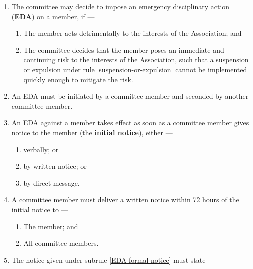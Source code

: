 \documentclass[../constitution.tex]{subfiles}
\begin{document}
\begin{enumerate}

  \item The committee may decide to impose an emergency disciplinary action (\textbf{EDA}) on a member, if ---

        \begin{enumerate}
          \item The member acts detrimentally to the interests of the Association; and
          \item The committee decides that the member poses an immediate and continuing risk to the interests of the Association, such that a suspension or expulsion under rule \ref{suspension-or-expulsion} cannot be implemented quickly enough to mitigate the risk.
        \end{enumerate}

  \item An EDA must be initiated by a committee member and seconded by another committee member.

  \item \label{EDA-initial-notice} An EDA against a member takes effect as soon as a committee member gives notice to the member (the \textbf{initial notice}), either ---

        \begin{enumerate}
          \item verbally; or
          \item by written notice; or
          \item by direct message.
        \end{enumerate}

  \item \label{EDA-formal-notice} A committee member must deliver a written notice within 72 hours of the initial notice to ---

        \begin{enumerate}
          \item The member; and
          \item All committee members.
        \end{enumerate}

  \item The notice given under subrule \ref{EDA-formal-notice} must state ---


\end{enumerate}
\end{document}
